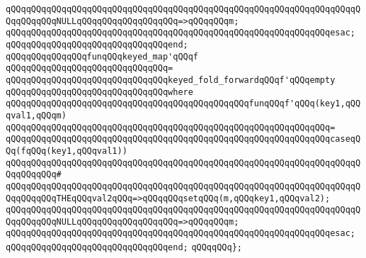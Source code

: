 \verb|qQQqqQQqqQQqqQQqqQQqqQQqqQQqqQQqqQQqqQQqqQQqqQQqqQQqqQQqqQQqqQQqqQQqqQQqqQQqqQQqNULLqQQqqQQqqQQqqQQqqQQq=>qQQqqQQqm;|\newline
\verb|qQQqqQQqqQQqqQQqqQQqqQQqqQQqqQQqqQQqqQQqqQQqqQQqqQQqqQQqqQQqqQQqesac;|\newline
\verb|qQQqqQQqqQQqqQQqqQQqqQQqqQQqqQQqend;|\newline
\newline
\verb|qQQqqQQqqQQqqQQqfunqQQqkeyed_map'qQQqf|\newline
\verb|qQQqqQQqqQQqqQQqqQQqqQQqqQQqqQQq=|\newline
\verb|qQQqqQQqqQQqqQQqqQQqqQQqqQQqqQQqkeyed_fold_forwardqQQqf'qQQqempty|\newline
\verb|qQQqqQQqqQQqqQQqqQQqqQQqqQQqqQQqwhere|\newline
\verb|qQQqqQQqqQQqqQQqqQQqqQQqqQQqqQQqqQQqqQQqqQQqqQQqfunqQQqf'qQQq(key1,qQQqval1,qQQqm)|\newline
\verb|qQQqqQQqqQQqqQQqqQQqqQQqqQQqqQQqqQQqqQQqqQQqqQQqqQQqqQQqqQQqqQQq=|\newline
\verb|qQQqqQQqqQQqqQQqqQQqqQQqqQQqqQQqqQQqqQQqqQQqqQQqqQQqqQQqqQQqqQQqcaseqQQq(fqQQq(key1,qQQqval1))|\newline
\verb|qQQqqQQqqQQqqQQqqQQqqQQqqQQqqQQqqQQqqQQqqQQqqQQqqQQqqQQqqQQqqQQqqQQqqQQqqQQqqQQq#|\newline
\verb|qQQqqQQqqQQqqQQqqQQqqQQqqQQqqQQqqQQqqQQqqQQqqQQqqQQqqQQqqQQqqQQqqQQqqQQqqQQqqQQqTHEqQQqval2qQQq=>qQQqqQQqsetqQQq(m,qQQqkey1,qQQqval2);|\newline
\verb|qQQqqQQqqQQqqQQqqQQqqQQqqQQqqQQqqQQqqQQqqQQqqQQqqQQqqQQqqQQqqQQqqQQqqQQqqQQqqQQqNULLqQQqqQQqqQQqqQQqqQQq=>qQQqqQQqm;|\newline
\verb|qQQqqQQqqQQqqQQqqQQqqQQqqQQqqQQqqQQqqQQqqQQqqQQqqQQqqQQqqQQqqQQqesac;|\newline
\verb|qQQqqQQqqQQqqQQqqQQqqQQqqQQqqQQqend;|\newline
\verb|qQQqqQQq};|\newline
\newline

